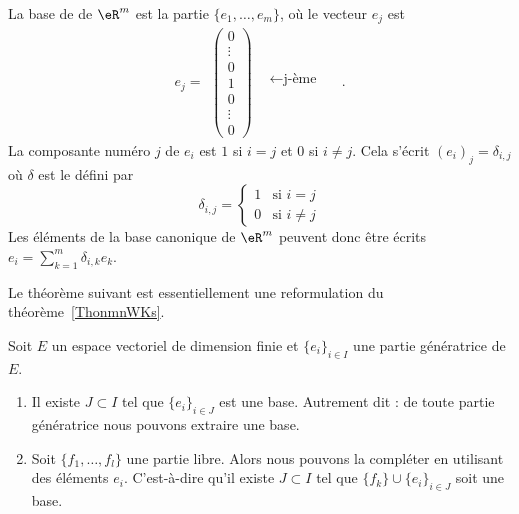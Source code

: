 \begin{example}
	La base de  de \( \eR^m\) est la partie \( \{e_1,\ldots, e_m\}\), où le vecteur \( e_j\) est
	\begin{equation}\nonumber
		e_j=
		\begin{array}{cc}
			\begin{pmatrix}
				0 \\\vdots\\0\\1\\ 0\\\vdots\\0
			\end{pmatrix} &
			\begin{matrix}
				\quad \\\quad\\\leftarrow\textrm{j-ème} \quad\\\quad\\\quad\\
			\end{matrix}
		\end{array}.
	\end{equation}
	La composante numéro \( j\) de \( e_i\) est \( 1\) si \( i=j\) et \( 0\) si \( i\neq j\). Cela s'écrit \( (e_i)_j=\delta_{i,j}\) où \( \delta\) est le  défini par
	\begin{equation}
		\delta_{i,j}=\begin{cases}
			1 & \text{si }i=j     \\
			0 & \text{si }i\neq j
		\end{cases}
	\end{equation}
	Les éléments de la base canonique de \( \eR^m\) peuvent donc être écrits \( e_i=\sum_{k=1}^m\delta_{i,k}e_k\).
\end{example}

Le théorème suivant est essentiellement une reformulation du théorème~\ref{ThonmnWKs}.
\begin{theorem} \label{ThoMGQZooIgrXjy}
	Soit \( E\) un espace vectoriel de dimension finie et \( \{ e_i \}_{i\in I}\) une partie génératrice de \( E\).

	\begin{enumerate}
		\item       \label{ITEMooTZUDooFEgymQ}
		      Il existe \( J\subset I\) tel que \( \{ e_i \}_{i\in J}\) est une base. Autrement dit : de toute partie génératrice nous pouvons extraire une base.
		\item       \label{ITEMooCJQGooXwjsfm}
		      Soit \( \{ f_1,\ldots, f_l \}\) une partie libre. Alors nous pouvons la compléter en utilisant des éléments \( e_i\). C'est-à-dire qu'il existe \( J\subset I\) tel que \( \{ f_k \}\cup\{ e_i \}_{i\in J}\) soit une base.
	\end{enumerate}
\end{theorem}

